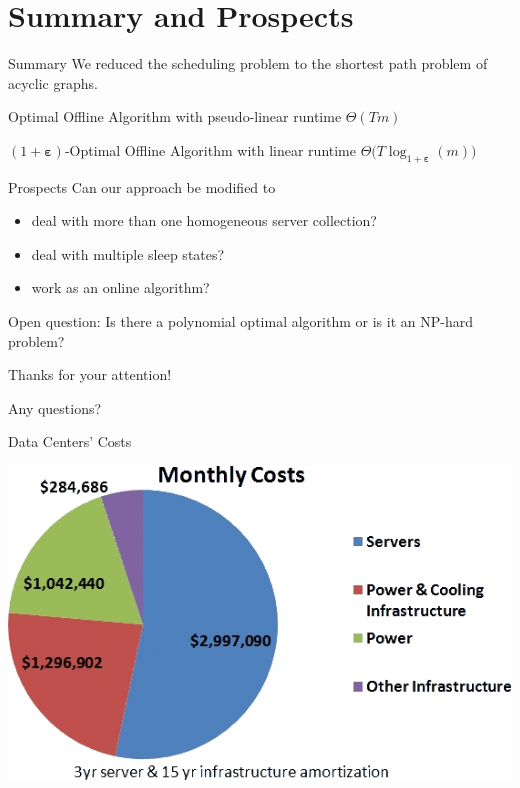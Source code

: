 \documentclass{beamer}
\newcommand{\beps}{\boldsymbol\varepsilon}
\begin{document}
\section{Summary and Prospects}
\begin{frame}{Summary}
We reduced the scheduling problem to the shortest path problem of acyclic graphs.

\pause
\begin{alertbox}
\centering Optimal Offline Algorithm with pseudo-linear runtime $\Theta(Tm)$
\end{alertbox}
\pause
\begin{alertbox}
\centering $(1+\beps)$-Optimal Offline Algorithm with linear runtime $\Theta\bigl(T\log_{1+\beps}(m)\bigr)$
\end{alertbox}
\end{frame}
\begin{frame}{Prospects}
Can our approach be modified to\dotso
\pause
\begin{itemize}[<+->]
	\item deal with more than one homogeneous server collection?
	\item deal with multiple sleep states?
	\item work as an online algorithm?
\end{itemize}
\pause[\thebeamerpauses]
Open question: Is there a polynomial optimal algorithm or is it an NP-hard problem?
\end{frame}
\begin{frame}[standout]
Thanks for your attention!

Any questions?
\end{frame}
\begin{frame}{Data Centers' Costs}

\vspace{0.5\baselineskip}
\centering\includegraphics[height=0.5\textheight]{img/data_center_costs.jpg}
\end{frame}
\end{document}
